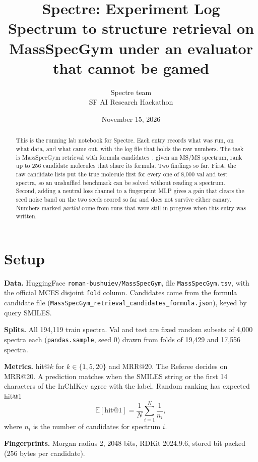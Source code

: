 \documentclass[11pt]{article}
\title{\textbf{Spectre: Experiment Log}\\[0.3em]\large Spectrum to structure retrieval on MassSpecGym under an evaluator that cannot be gamed}
\author{Spectre team\\\small SF AI Research Hackathon}
\date{November 15, 2026}
\begin{document}
\maketitle

\begin{abstract}
\noindent
This is the running lab notebook for Spectre. Each entry records what was run, on what data, and what came out, with
the log file that holds the raw numbers. The task is MassSpecGym retrieval with formula candidates~\cite{msg}: given
an MS/MS spectrum, rank up to 256 candidate molecules that share its formula. Two findings so far. First, the raw
candidate lists put the true molecule first for every one of 8{,}000 val and test spectra, so an unshuffled
benchmark can be solved without reading a spectrum. Second, adding a neutral loss channel to a fingerprint MLP gives a
gain that clears the seed noise band on the two seeds scored so far and does not survive either canary.
Numbers marked \emph{partial} come from runs that were still in progress when this entry was written.
\end{abstract}

\section*{Setup}

\textbf{Data.} HuggingFace \texttt{roman-bushuiev/MassSpecGym}, file \texttt{MassSpecGym.tsv}, with the official
MCES disjoint \texttt{fold} column. Candidates come from the formula candidate file
(\texttt{MassSpecGym\_retrieval\_\allowbreak candidates\_formula.json}), keyed by query SMILES.

\textbf{Splits.} All 194{,}119 train spectra. Val and test are fixed random subsets of 4{,}000 spectra each
(\texttt{pandas.sample}, seed 0) drawn from folds of 19{,}429 and 17{,}556 spectra.

\textbf{Metrics.} hit@$k$ for $k \in \{1,5,20\}$ and MRR@20. The Referee decides on MRR@20. A prediction matches when
the SMILES string or the first 14 characters of the InChIKey agree with the label. Random ranking has expected hit@1
\begin{equation*}
  \mathbb{E}[\text{hit@1}] = \frac{1}{N}\sum_{i=1}^{N} \frac{1}{n_i},
\end{equation*}
where $n_i$ is the number of candidates for spectrum $i$.

\textbf{Fingerprints.} Morgan radius 2, 2048 bits, RDKit 2024.9.6, stored bit packed (256 bytes per candidate).
\end{document}

